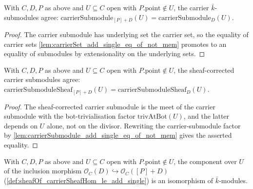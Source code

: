 \begin{lemma}
  \label{lem:carrierSubmodule_add_single_eq_of_not_mem}
  With \(C, D, P\) as above and \(U \subseteq C\) open with
  \(P.\mathrm{point} \notin U\), the carrier \(\bar k\)-submodules agree:
  \(\mathrm{carrierSubmodule}_{[P]+D}(U) = \mathrm{carrierSubmodule}_D(U)\).
\end{lemma}

\begin{proof}
  The carrier submodule has underlying set the carrier set, so the equality of
  carrier sets \cref{lem:carrierSet_add_single_eq_of_not_mem} promotes to an
  equality of submodules by extensionality on the underlying sets.
\end{proof}

\begin{lemma}

  \label{lem:carrierSubmoduleSheaf_add_single_eq_of_not_mem}
  With \(C, D, P\) as above and \(U \subseteq C\) open with
  \(P.\mathrm{point} \notin U\), the sheaf-corrected carrier submodules agree:
  \(\mathrm{carrierSubmoduleSheaf}_{[P]+D}(U) =
  \mathrm{carrierSubmoduleSheaf}_D(U)\).
\end{lemma}

\begin{proof}
  The sheaf-corrected carrier submodule is the meet of the carrier submodule
  with the bot-trivialisation factor \(\mathrm{trivAtBot}(U)\), and the latter
  depends on \(U\) alone, not on the divisor. Rewriting the carrier-submodule
  factor by \cref{lem:carrierSubmodule_add_single_eq_of_not_mem} gives the
  asserted equality.
\end{proof}

\begin{lemma}
  \label{lem:carrierPresheaf_le_hom_app_isIso_of_not_mem}
  With \(C, D, P\) as above and \(U \subseteq C\) open with
  \(P.\mathrm{point} \notin U\), the component over \(U\) of the inclusion
  morphism \(\mathcal O_C(D) \hookrightarrow \mathcal O_C([P]+D)\)
  (\cref{def:sheafOf_carrierSheafHom_le_add_single}) is an isomorphism of
  \(\bar k\)-modules.
\end{lemma}

